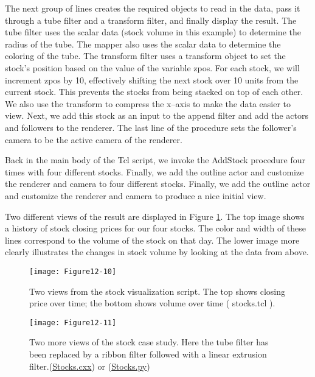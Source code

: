The next group of lines creates the required objects to read in the data, pass it through a tube filter and a transform filter, and finally display the result. The tube filter uses the scalar data (stock volume in this example) to determine the radius of the tube. The mapper also uses the scalar data to determine the coloring of the tube. The transform filter uses a transform object to set the stock's position based on the value of the variable zpos. For each stock, we will increment zpos by 10, effectively shifting the next stock over 10 units from the current stock. This prevents the stocks from being stacked on top of each other. We also use the transform to compress the x--axis to make the data easier to view. Next, we add this stock as an input to the append filter and add the actors and followers to the renderer. The last line of the procedure sets the follower's camera to be the active camera of the renderer.

Back in the main body of the Tcl script, we invoke the AddStock procedure four times with four different stocks. Finally, we add the outline actor and customize the renderer and camera to  four different stocks. Finally, we add the outline actor and customize the renderer and camera to produce a nice initial view.

Two different views of the result are displayed in Figure \ref{fig:Figure12-10}. The top image shows a history of stock closing prices for our four stocks. The color and width of these lines correspond to the volume of the stock on that day. The lower image more clearly illustrates the changes in stock volume by looking at the data from above.

\begin{figure}[!htb]
	\centering
	\texttt{[image: Figure12-10]}
	\caption{Two views from the stock visualization script. The top shows closing price over time; the bottom shows volume over time ( stocks.tcl ).}
	\label{fig:Figure12-10}
\end{figure}

\begin{figure}[!htb]
	\centering
	\texttt{[image: Figure12-11]}
	\caption{Two more views of the stock case study. Here the
		tube filter has been replaced by a ribbon filter followed with a
		linear extrusion filter.(\href{https://lorensen.github.io/VTKExamples/site/Cxx/VisualizationAlgorithms/Stocks/}{Stocks.cxx}) or (\href{https://lorensen.github.io/VTKExamples/site/Python//VisualizationAlgorithms/Stocks/}{Stocks.py})}
	\label{fig:Figure12-11}
\end{figure}

